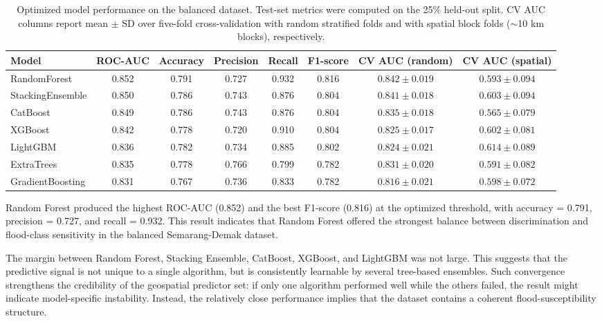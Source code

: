 \documentclass[11pt,twoside]{article}
\begin{document}
\begin{table}[ht]
\centering
\caption{Optimized model performance on the balanced dataset. Test-set metrics
were computed on the 25\% held-out split. CV AUC columns report mean $\pm$ SD
over five-fold cross-validation with random stratified folds and with spatial
block folds ($\sim$10 km blocks), respectively.}
\label{tab:model-performance}
\begin{tabular}{lccccc cc}
\hline
\textbf{Model} & \textbf{ROC-AUC} & \textbf{Accuracy} & \textbf{Precision} &
\textbf{Recall} & \textbf{F1-score} & \textbf{CV AUC (random)} & \textbf{CV AUC (spatial)} \\
\hline
RandomForest      & 0.852 & 0.791 & 0.727 & 0.932 & 0.816 & $0.842 \pm 0.019$ & $0.593 \pm 0.094$ \\
StackingEnsemble  & 0.850 & 0.786 & 0.743 & 0.876 & 0.804 & $0.841 \pm 0.018$ & $0.603 \pm 0.094$ \\
CatBoost          & 0.849 & 0.786 & 0.743 & 0.876 & 0.804 & $0.835 \pm 0.018$ & $0.565 \pm 0.079$ \\
XGBoost           & 0.842 & 0.778 & 0.720 & 0.910 & 0.804 & $0.825 \pm 0.017$ & $0.602 \pm 0.081$ \\
LightGBM          & 0.836 & 0.782 & 0.734 & 0.885 & 0.802 & $0.824 \pm 0.021$ & $0.614 \pm 0.089$ \\
ExtraTrees        & 0.835 & 0.778 & 0.766 & 0.799 & 0.782 & $0.831 \pm 0.020$ & $0.591 \pm 0.082$ \\
GradientBoosting  & 0.831 & 0.767 & 0.736 & 0.833 & 0.782 & $0.816 \pm 0.021$ & $0.598 \pm 0.072$ \\
\hline
\end{tabular}
\end{table}
 
Random Forest produced the highest ROC-AUC (0.852) and the best F1-score (0.816)
at the optimized threshold, with accuracy = 0.791, precision = 0.727, and recall
= 0.932. This result indicates that Random Forest offered the strongest balance
between discrimination and flood-class sensitivity in the balanced
Semarang-Demak dataset.
 
The margin between Random Forest, Stacking Ensemble, CatBoost, XGBoost, and
LightGBM was not large. This suggests that the predictive signal is not unique
to a single algorithm, but is consistently learnable by several tree-based
ensembles. Such convergence strengthens the credibility of the geospatial
predictor set: if only one algorithm performed well while the others failed, the
result might indicate model-specific instability. Instead, the relatively close
performance implies that the dataset contains a coherent flood-susceptibility
structure.
 
\end{document}

